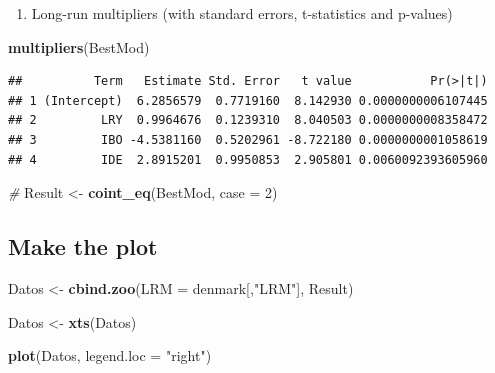 \documentclass[
]{book}
\newenvironment{Shaded}{\begin{snugshade}}{\end{snugshade}}
\newcommand{\AttributeTok}[1]{\textcolor[rgb]{0.13,0.29,0.53}{#1}}
\newcommand{\CommentTok}[1]{\textcolor[rgb]{0.56,0.35,0.01}{\textit{#1}}}
\newcommand{\DecValTok}[1]{\textcolor[rgb]{0.00,0.00,0.81}{#1}}
\newcommand{\FunctionTok}[1]{\textcolor[rgb]{0.13,0.29,0.53}{\textbf{#1}}}
\newcommand{\NormalTok}[1]{#1}
\newcommand{\OtherTok}[1]{\textcolor[rgb]{0.56,0.35,0.01}{#1}}
\newcommand{\StringTok}[1]{\textcolor[rgb]{0.31,0.60,0.02}{#1}}
\providecommand{\tightlist}{%
  \setlength{\itemsep}{0pt}\setlength{\parskip}{0pt}}
\begin{document}
\begin{enumerate}
\def\labelenumi{\arabic{enumi}.}
\setcounter{enumi}{4}
\tightlist
\item
  Long-run multipliers (with standard errors, t-statistics and p-values)
\end{enumerate}

\begin{Shaded}
\begin{Highlighting}[]
\FunctionTok{multipliers}\NormalTok{(BestMod)}
\end{Highlighting}
\end{Shaded}

\begin{verbatim}
##          Term   Estimate Std. Error   t value           Pr(>|t|)
## 1 (Intercept)  6.2856579  0.7719160  8.142930 0.0000000006107445
## 2         LRY  0.9964676  0.1239310  8.040503 0.0000000008358472
## 3         IBO -4.5381160  0.5202961 -8.722180 0.0000000001058619
## 4         IDE  2.8915201  0.9950853  2.905801 0.0060092393605960
\end{verbatim}

\begin{Shaded}
\begin{Highlighting}[]
\CommentTok{\#}
\NormalTok{Result }\OtherTok{\textless{}{-}} \FunctionTok{coint\_eq}\NormalTok{(BestMod, }\AttributeTok{case =} \DecValTok{2}\NormalTok{)}
\end{Highlighting}
\end{Shaded}

\hypertarget{make-the-plot}{%
\subsection{Make the plot}\label{make-the-plot}}

\begin{Shaded}
\begin{Highlighting}[]
\NormalTok{Datos }\OtherTok{\textless{}{-}} \FunctionTok{cbind.zoo}\NormalTok{(}\AttributeTok{LRM =}\NormalTok{ denmark[,}\StringTok{"LRM"}\NormalTok{], Result)}

\NormalTok{Datos }\OtherTok{\textless{}{-}} \FunctionTok{xts}\NormalTok{(Datos)}

\FunctionTok{plot}\NormalTok{(Datos, }\AttributeTok{legend.loc =} \StringTok{"right"}\NormalTok{)}
\end{Highlighting}
\end{Shaded}
\end{document}
